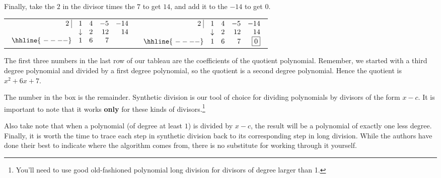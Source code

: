 Finally, take the $2$ in the divisor times the $7$ to get $14$, and add it to the $-14$ to get $0$.

\bigskip

\begin{center}

\begin{tabular}{cc}

$ \begin{array}{rrrrr}


  2 \, \, \vline& 1 & 4 & -5  & -14 \\

   & \downarrow &  2  &  12  & 14 \\ \hhline{~----} 
  & 1  &   6  & 7  &    \\  
\end{array}$ \hspace{1in} 

&

$ \begin{array}{rrrrr}


  2 \, \, \vline& 1 & 4 & -5  & -14 \\

   & \downarrow &  2  &  12  & 14 \\ \hhline{~----} 
  & 1  &   6  & 7  &  \fbox{$0$}  \\  
\end{array}$ \\



\end{tabular}

\end{center}

The first three numbers in the last row of our tableau are the coefficients of the quotient polynomial.  Remember, we started with a third degree polynomial and divided by a first degree polynomial, so the quotient is a second degree polynomial.  Hence the quotient is $x^2+6x+7$.  

\medskip

The number in the box is the remainder.  Synthetic division is our tool of choice for dividing polynomials by divisors of the form $x-c$.  It is important to note that it works \textbf{only} for these kinds of divisors.\footnote{You'll need to use good old-fashioned polynomial long division for divisors of degree larger than 1.} 

\medskip

Also take note that when a polynomial (of degree at least $1$) is divided by $x-c$, the result will be a polynomial of exactly one less degree. Finally, it is  worth the time to trace each step in synthetic division back to its corresponding step in long division.  While the authors have done their best to indicate where the algorithm comes from, there is no substitute for working through it yourself.

